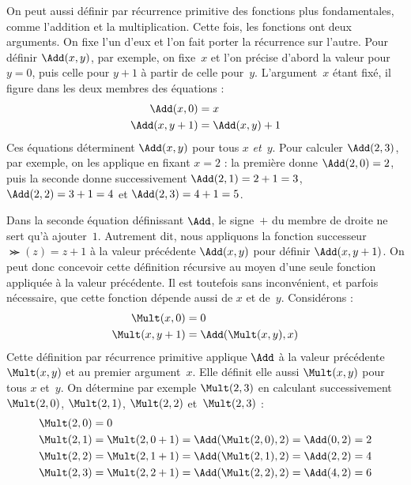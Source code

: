\documentclass[../../../include/open-logic-section]{subfiles}
\begin{document}
On peut aussi définir par récurrence primitive des fonctions plus
fondamentales, comme l'addition et la multiplication. Cette fois,
les fonctions ont deux arguments. On fixe l'un d'eux et l'on fait
porter la récurrence sur l'autre. Pour définir $\Add(x,y)$, par
exemple, on fixe~$x$ et l'on précise d'abord la valeur pour $y=0$,
puis celle pour $y+1$ à partir de celle pour~$y$. L'argument~$x$
étant fixé, il figure dans les deux membres des équations :
\begin{align*}
\Add(x,0) & =  x\\
\Add(x,y+1) & =  \Add(x,y)+1
\end{align*}
Ces équations déterminent $\Add(x,y)$ pour tous $x$ \emph{et}~$y$.
Pour calculer $\Add(2,3)$, par exemple, on les applique en fixant
$x=2$ : la première donne $\Add(2,0)=2$, puis la seconde donne
successivement $\Add(2,1)=2+1=3$, $\Add(2,2)=3+1=4$ et
$\Add(2,3)=4+1=5$.

Dans la seconde équation définissant $\Add$, le signe~$+$ du membre
de droite ne sert qu'à ajouter~$1$. Autrement dit, nous appliquons
la fonction successeur $\Succ(z)=z+1$ à la valeur précédente
$\Add(x,y)$ pour définir $\Add(x,y+1)$. On peut donc concevoir
cette définition récursive au moyen d'une seule fonction appliquée
à la valeur précédente. Il est toutefois sans inconvénient, et
parfois nécessaire, que cette fonction dépende aussi de $x$ et
de~$y$. Considérons :
\begin{align*}
  \Mult(x,0) & =  0 \\
  \Mult(x,y+1) & =  \Add(\Mult(x,y),x)
\end{align*}
Cette définition par récurrence primitive applique $\Add$ à la
valeur précédente $\Mult(x,y)$ et au premier argument~$x$. Elle
définit elle aussi $\Mult(x,y)$ pour tous $x$ et~$y$. On détermine
par exemple $\Mult(2,3)$ en calculant successivement $\Mult(2,0)$,
$\Mult(2,1)$, $\Mult(2,2)$ et~$\Mult(2,3)$ :
\begin{align*}
  \Mult(2,0) & = 0\\
  \Mult(2,1) & = \Mult(2,0+1) =
  \Add(\Mult(2,0), 2) = \Add(0, 2) = 2\\
  \Mult(2,2) & = \Mult(2,1+1) =
  \Add(\Mult(2,1), 2) = \Add(2, 2) = 4\\
  \Mult(2,3) & = \Mult(2,2+1) =
  \Add(\Mult(2,2), 2) = \Add(4, 2) = 6
\end{align*}
\end{document}
